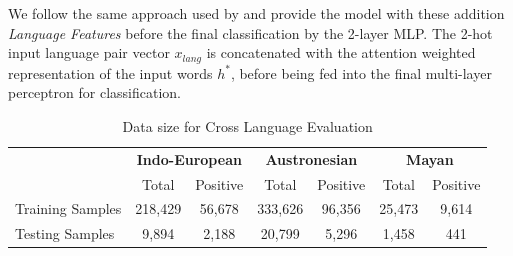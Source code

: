 \documentclass[11pt,letterpaper]{article}
\begin{document}
We follow the same approach used by \cite{rama2016siamese} and provide the model with these addition \textit{Language Features} before the final classification by the 2-layer MLP. The 2-hot input language pair vector $x_{lang}$ is concatenated with the attention weighted representation of the input words $h^{*}$, before being fed into the final multi-layer perceptron for classification.

\begin{table}[t]
\centering
\begin{tabular}{lcccccc}
\multicolumn{1}{c}{\textbf{}} & \multicolumn{2}{c}{\textbf{Indo-European}} & \multicolumn{2}{c}{\textbf{Austronesian}} & \multicolumn{2}{c}{\textbf{Mayan}} \\
\multicolumn{1}{c}{}          & Total               & Positive             & Total               & Positive            & Total           & Positive         \\
Training Samples              & 218,429             & 56,678               & 333,626             & 96,356              & 25,473          & 9,614            \\
Testing Samples               & 9,894               & 2,188                & 20,799              & 5,296               & 1,458           & 441             
\end{tabular}
\caption{Data size for Cross Language Evaluation}
\label{CL_count}
\end{table}
\end{document}
